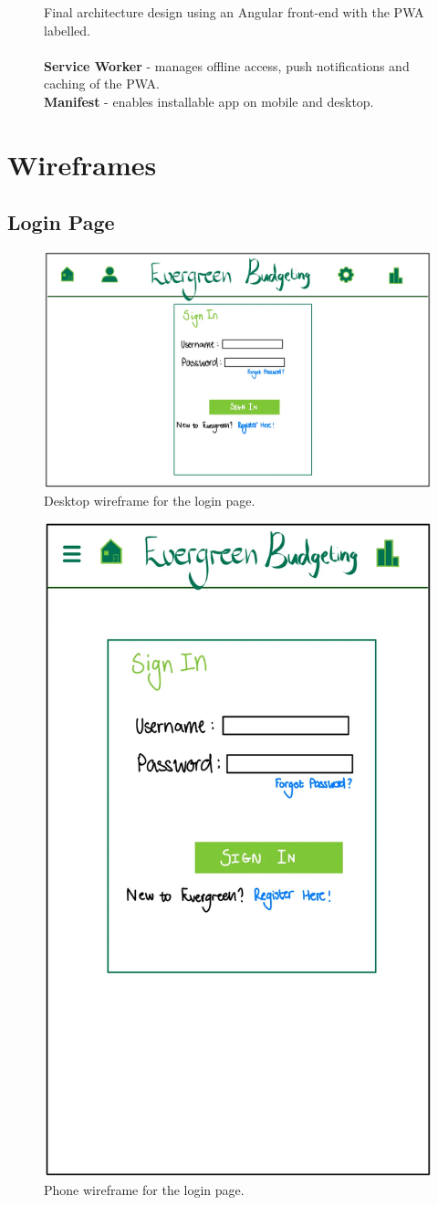 \documentclass{l4proj}
\begin{document}
\begin{appendices}
\begin{figure}[htb]
\begin{subfigure}[b]{0.75\textwidth}
        \label{fig:syn1}
    \end{subfigure}   
    \caption{Final architecture design using an Angular front-end with the PWA labelled. \\ \\
    \textbf{Service Worker} - manages offline access, push notifications and caching of the PWA. \\
    \textbf{Manifest} - enables installable app on mobile and desktop.}
    \label{fig:synthetic}
\end{figure}

\chapter{Wireframes}
\label{app:wireframes}
\section{Login Page}
\begin{figure}[htb]
    \centering
    \includegraphics[width=0.75\linewidth]{images/Wireframes/wireframe-login-desktop.png}
    \caption{Desktop wireframe for the login page.}
    \label{fig:enter-label}
\end{figure}

\begin{figure}[htb]
    \centering
    \includegraphics[width=0.35\linewidth]{images/Wireframes/wireframe-login-phone.png}
    \caption{Phone wireframe for the login page.}
    \label{fig:enter-label}
\end{figure}
\newpage


\end{appendices}
\end{document}

